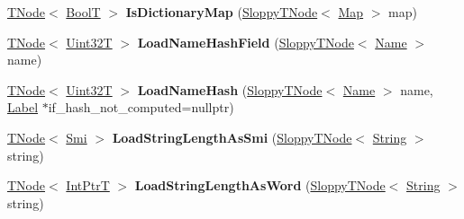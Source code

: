 \begin{DoxyCompactItemize}
\mbox{\hyperlink{classv8_1_1internal_1_1compiler_1_1TNode}{T\+Node}}$<$ \mbox{\hyperlink{structv8_1_1internal_1_1BoolT}{BoolT}} $>$ {\bfseries Is\+Dictionary\+Map} (\mbox{\hyperlink{classv8_1_1internal_1_1compiler_1_1SloppyTNode}{Sloppy\+T\+Node}}$<$ \mbox{\hyperlink{classv8_1_1internal_1_1Map}{Map}} $>$ map)
\item 
\mbox{\label{classv8_1_1internal_1_1CodeStubAssembler_a9e3fbce6784983b6e1a713ebde1e6d12}} 
\mbox{\hyperlink{classv8_1_1internal_1_1compiler_1_1TNode}{T\+Node}}$<$ \mbox{\hyperlink{structv8_1_1internal_1_1Uint32T}{Uint32T}} $>$ {\bfseries Load\+Name\+Hash\+Field} (\mbox{\hyperlink{classv8_1_1internal_1_1compiler_1_1SloppyTNode}{Sloppy\+T\+Node}}$<$ \mbox{\hyperlink{classv8_1_1internal_1_1Name}{Name}} $>$ name)
\item 
\mbox{\label{classv8_1_1internal_1_1CodeStubAssembler_ab73f186d630bbdce2e11412f182eeeb9}} 
\mbox{\hyperlink{classv8_1_1internal_1_1compiler_1_1TNode}{T\+Node}}$<$ \mbox{\hyperlink{structv8_1_1internal_1_1Uint32T}{Uint32T}} $>$ {\bfseries Load\+Name\+Hash} (\mbox{\hyperlink{classv8_1_1internal_1_1compiler_1_1SloppyTNode}{Sloppy\+T\+Node}}$<$ \mbox{\hyperlink{classv8_1_1internal_1_1Name}{Name}} $>$ name, \mbox{\hyperlink{classv8_1_1internal_1_1compiler_1_1CodeAssemblerLabel}{Label}} $\ast$if\+\_\+hash\+\_\+not\+\_\+computed=nullptr)
\item 
\mbox{\label{classv8_1_1internal_1_1CodeStubAssembler_adc0e109f93674613db706470a4ac0b66}} 
\mbox{\hyperlink{classv8_1_1internal_1_1compiler_1_1TNode}{T\+Node}}$<$ \mbox{\hyperlink{classv8_1_1internal_1_1Smi}{Smi}} $>$ {\bfseries Load\+String\+Length\+As\+Smi} (\mbox{\hyperlink{classv8_1_1internal_1_1compiler_1_1SloppyTNode}{Sloppy\+T\+Node}}$<$ \mbox{\hyperlink{classv8_1_1internal_1_1String}{String}} $>$ string)
\item 
\mbox{\label{classv8_1_1internal_1_1CodeStubAssembler_a47b5ed5769552f47049e7e65b0cd2c80}} 
\mbox{\hyperlink{classv8_1_1internal_1_1compiler_1_1TNode}{T\+Node}}$<$ \mbox{\hyperlink{structv8_1_1internal_1_1IntPtrT}{Int\+PtrT}} $>$ {\bfseries Load\+String\+Length\+As\+Word} (\mbox{\hyperlink{classv8_1_1internal_1_1compiler_1_1SloppyTNode}{Sloppy\+T\+Node}}$<$ \mbox{\hyperlink{classv8_1_1internal_1_1String}{String}} $>$ string)

\end{DoxyCompactItemize}
